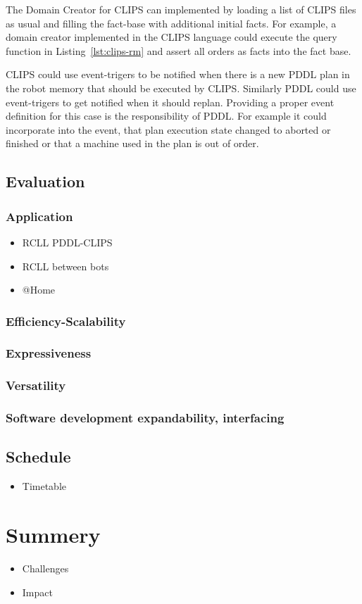 \documentclass[a4paper,11pt]{article}
\newcommand{\reflst}[1]{Listing~\ref{#1}}
\begin{document}
The Domain Creator for CLIPS can implemented by loading a list of
CLIPS files as usual and filling the fact-base with additional initial
facts. For example, a domain creator implemented in the CLIPS language
could execute the query function in \reflst{lst:clips-rm} and assert
all orders as facts into the fact base.

CLIPS could use event-trigers to be notified when there is a new PDDL
plan in the robot memory that should be executed by CLIPS. Similarly
PDDL could use event-trigers to get notified when it should
replan. Providing a proper event definition for this case is the
responsibility of PDDL. For example it could incorporate into the
event, that plan execution state changed to aborted or finished or
that a machine used in the plan is out of order.

\subsection{Evaluation}
\label{sec:eval}
\subsubsection{Application}
\label{sec:eval-apl}
\begin{itemize}
\item RCLL PDDL-CLIPS
\item RCLL between bots
\item @Home
\end{itemize}
\subsubsection{Efficiency-Scalability}
\subsubsection{Expressiveness}
\subsubsection{Versatility}
\subsubsection{Software development expandability, interfacing}

\subsection{Schedule}
\begin{itemize}
\item Timetable
\end{itemize}

\section{Summery}
\label{sec:summery}
\begin{itemize}
\item Challenges
\item Impact
\end{itemize}




\end{document}
